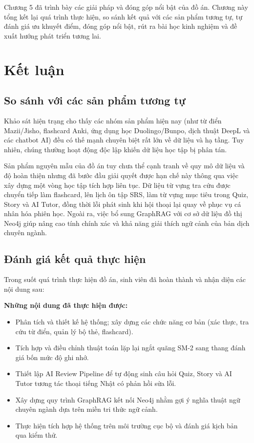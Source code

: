 \documentclass[../DoAn.tex]{subfiles}
\begin{document}
Chương 5 đã trình bày các giải pháp và đóng góp nổi bật của đồ án. Chương này tổng kết lại quá trình thực hiện, so sánh kết quả với các sản phẩm tương tự, tự đánh giá ưu khuyết điểm, đóng góp nổi bật, rút ra bài học kinh nghiệm và đề xuất hướng phát triển tương lai.

\section{Kết luận}
\label{section:6.1}

\subsection{So sánh với các sản phẩm tương tự}

Khảo sát hiện trạng cho thấy các nhóm sản phẩm hiện nay (như từ điển Mazii/Jisho, flashcard Anki, ứng dụng học Duolingo/Bunpo, dịch thuật DeepL và các chatbot AI) đều có thế mạnh chuyên biệt rất lớn về dữ liệu và hạ tầng. Tuy nhiên, chúng thường hoạt động độc lập khiến dữ liệu học tập bị phân tán. 

Sản phẩm nguyên mẫu của đồ án tuy chưa thể cạnh tranh về quy mô dữ liệu và độ hoàn thiện nhưng đã bước đầu giải quyết được hạn chế này thông qua việc xây dựng một vòng học tập tích hợp liên tục. Dữ liệu từ vựng tra cứu được chuyển tiếp làm flashcard, lên lịch ôn tập SRS, làm từ vựng mục tiêu trong Quiz, Story và AI Tutor, đồng thời lỗi phát sinh khi hội thoại lại quay về phục vụ cá nhân hóa phiên học. Ngoài ra, việc bổ sung GraphRAG với cơ sở dữ liệu đồ thị Neo4j giúp nâng cao tính chính xác và khả năng giải thích ngữ cảnh của bản dịch chuyên ngành.

\subsection{Đánh giá kết quả thực hiện}

Trong suốt quá trình thực hiện đồ án, sinh viên đã hoàn thành và nhận diện các nội dung sau:

\textbf{Những nội dung đã thực hiện được:}
\begin{itemize}[itemsep=0pt,parsep=0pt,topsep=2pt,partopsep=0pt]
    \item Phân tích và thiết kế hệ thống; xây dựng các chức năng cơ bản (xác thực, tra cứu từ điển, quản lý bộ thẻ, flashcard).
    \item Tích hợp và điều chỉnh thuật toán lặp lại ngắt quãng SM-2 sang thang đánh giá bốn mức độ ghi nhớ.
    \item Thiết lập AI Review Pipeline để tự động sinh câu hỏi Quiz, Story và AI Tutor tương tác thoại tiếng Nhật có phản hồi sửa lỗi.
    \item Xây dựng quy trình GraphRAG kết nối Neo4j nhằm gợi ý nghĩa thuật ngữ chuyên ngành dựa trên miền tri thức ngữ cảnh.
    \item Thực hiện tích hợp hệ thống trên môi trường cục bộ và đánh giá kịch bản qua kiểm thử.
\end{itemize}
\end{document}
